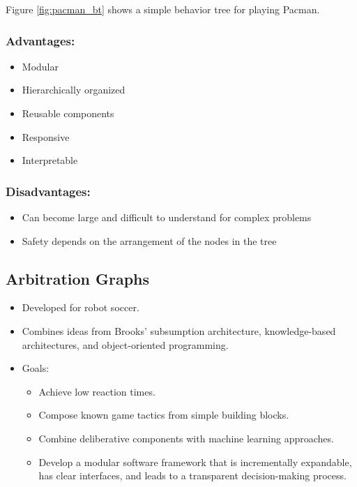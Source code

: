 Figure \ref{fig:pacman_bt} shows a simple behavior tree for playing Pacman.

\subsubsection*{Advantages:}
\begin{itemize}
    \item Modular
    \item Hierarchically organized
    \item Reusable components
    \item Responsive
    \item Interpretable
\end{itemize}

\subsubsection*{Disadvantages:}
\begin{itemize}
    \item Can become large and difficult to understand for complex problems
    \item Safety depends on the arrangement of the nodes in the tree
\end{itemize}

\subsection*{Arbitration Graphs}

\begin{itemize}
    \item Developed for robot soccer.
    \item Combines ideas from Brooks' subsumption architecture, knowledge-based architectures, and object-oriented programming.
    \item Goals:
          \begin{itemize}
              \item Achieve low reaction times.
              \item Compose known game tactics from simple building blocks.
              \item Combine deliberative components with machine learning approaches.
              \item Develop a modular software framework that is incrementally expandable, has clear interfaces, and leads to a transparent decision-making process.
          \end{itemize}
\end{itemize}

